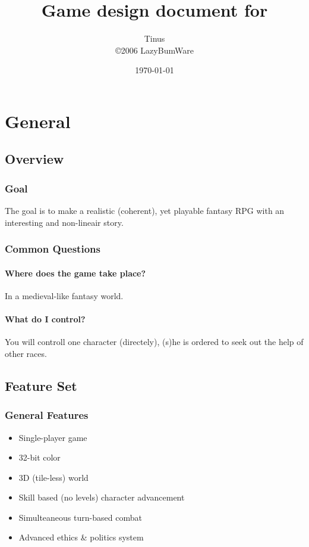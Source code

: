 \documentclass[a4paper]{report}
\title{
	Game design document for \\ 
	\nadruk{The Scattered Lands}
}
\author{
	Tinus \\
	\copyright 2006 LazyBumWare
}
\date{\today}
\begin{document}
\maketitle
\tableofcontents

\part{General}

	\chapter{Overview}

		\section{Goal}

			The goal is to make a realistic (coherent), yet playable fantasy RPG with an interesting and non-lineair story.

		\section{Common Questions}

			\subsection{Where does the game take place?}

				In a medieval-like fantasy world.

			\subsection{What do I control?}

				You will controll one character (directely), (s)he is ordered to seek out the help of other races.

	\chapter{Feature Set}

		\section{General Features}

			\begin{itemize}
				\item Single-player game
				\item 32-bit color
				\item 3D (tile-less) world
				\item Skill based (no levels) character advancement
				\item Simulteaneous turn-based combat
				\item Advanced ethics \& politics system
			\end{itemize}
\end{document}

